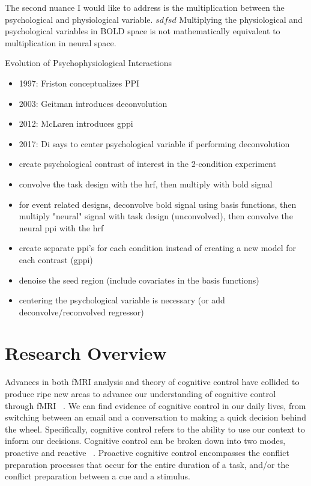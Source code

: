 \documentclass[phd,appendix,figures]{uithesis}
\begin{document}
The second nuance I would like to address is the multiplication between
the psychological and physiological variable.
$sdfsd$
Multiplying the physiological and psychological variables in BOLD space
is not mathematically equivalent to multiplication in neural space.

Evolution of Psychophysiological Interactions
\begin{itemize}
	\item 1997: Friston conceptualizes PPI
	\item 2003: Geitman introduces deconvolution
	\item 2012: McLaren introduces gppi
	\item 2017: Di says to center psychological variable if performing deconvolution
	\item create psychological contrast of interest in the 2-condition experiment
	\item convolve the task design with the hrf, then multiply with bold signal
	\item for event related designs, deconvolve bold signal using basis functions,
		  then multiply "neural" signal with task design (unconvolved), then convolve
		  the neural ppi with the hrf
	\item create separate ppi's for each condition instead of creating a new model for each contrast (gppi)
	\item denoise the seed region (include covariates in the basis functions)
	\item centering the psychological variable is necessary (or add deconvolve/reconvolved regressor)
	       
\end{itemize}


\chapter{Research Overview}

Advances in both fMRI analysis and theory of cognitive control have collided to produce ripe new areas to advance our understanding of cognitive control through fMRI ~\citep{Braver2012,Rissman2004,Mumford2012,Cisler2012}.
We can find evidence of cognitive control in our daily lives, from switching between an email and a conversation to making a quick decision behind the wheel. 
Specifically, cognitive control refers to the ability to use our context to inform our decisions. Cognitive control can be broken down into two modes, proactive and reactive ~\citep{Braver2012}. 
Proactive cognitive control encompasses the conflict preparation processes that occur for the entire duration of a task, and/or the conflict preparation between a cue and a stimulus.
\end{document}
